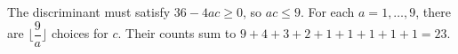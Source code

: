 The discriminant must satisfy $36-4ac\ge0$, so $ac\le9$. For each $a=1,\ldots,9$, there are $\lfloor\dfrac{9}{a}\rfloor$ choices for $c$. Their counts sum to $9+4+3+2+1+1+1+1+1=\boxed{23}$.
